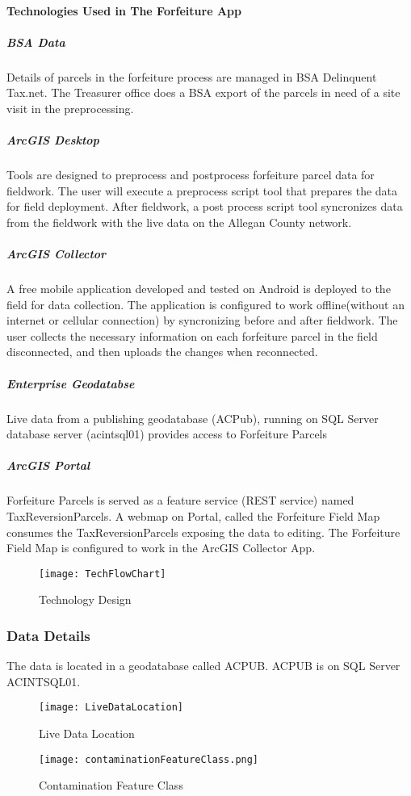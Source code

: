 \paragraph{Technologies Used in The Forfeiture App}
\begin{adjmulticols}{2}{\innerMar}{\outerMar}
\subparagraph{BSA Data}
\noindent Details of parcels in the forfeiture process are managed in BSA Delinquent Tax.net.  The Treasurer office does a BSA export of the parcels in need of a site visit in the preprocessing.
\subparagraph{ArcGIS Desktop}\noindent Tools are designed to preprocess and postprocess forfeiture parcel data for fieldwork.  The user will execute a preprocess script tool that prepares the data for field deployment.  After fieldwork, a post process script tool syncronizes data from the fieldwork with the live data on the Allegan County network.
\subparagraph{ArcGIS Collector}\noindent A free mobile application developed and tested on Android is deployed to the field for data collection.  The application is configured to work offline(without an internet or cellular connection) by syncronizing before and after fieldwork. The user collects the necessary information on each forfeiture parcel in the field disconnected, and then uploads the changes when reconnected.
\subparagraph{Enterprise Geodatabse}\noindent Live data from a publishing geodatabase (ACPub), running on SQL Server database server (acintsql01) provides access to Forfeiture Parcels
\subparagraph{ArcGIS Portal} \noindent Forfeiture Parcels is served as a feature service (REST service)  named TaxReversionParcels.  A webmap on Portal, called the Forfeiture Field Map consumes the TaxReversionParcels exposing the data to editing.  The Forfeiture Field Map is configured to work in the ArcGIS Collector App.
\end{adjmulticols}
\begin{figure}[H]
\centering
    \texttt{[image: TechFlowChart]}
\vspace{-.2in}

\caption{Technology Design}
\end{figure}
\clearpage
\subsubsection[Data Details]{Data Details\texorpdfstring{\\}{}}
\noindent The data is located in a geodatabase called ACPUB.  ACPUB is on SQL Server ACINTSQL01.
\begin{wrapfigure}{r}{0.6\textwidth}
\centering
    \texttt{[image: LiveDataLocation]}
\caption{Live Data Location}
\vspace{.1in}

\HRule
\vspace{.2in}

    \texttt{[image: contaminationFeatureClass.png]}
\caption{Contamination Feature Class}
\end{wrapfigure}
\vspace{1in}

